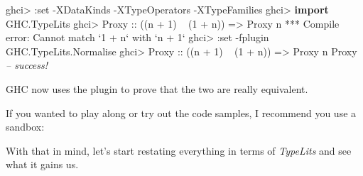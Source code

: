 \documentclass[]{article}
\newenvironment{Shaded}{}{}
\newcommand{\KeywordTok}[1]{\textcolor[rgb]{0.00,0.44,0.13}{\textbf{{#1}}}}
\newcommand{\DataTypeTok}[1]{\textcolor[rgb]{0.56,0.13,0.00}{{#1}}}
\newcommand{\DecValTok}[1]{\textcolor[rgb]{0.25,0.63,0.44}{{#1}}}
\newcommand{\CommentTok}[1]{\textcolor[rgb]{0.38,0.63,0.69}{\textit{{#1}}}}
\newcommand{\OtherTok}[1]{\textcolor[rgb]{0.00,0.44,0.13}{{#1}}}
\newcommand{\FunctionTok}[1]{\textcolor[rgb]{0.02,0.16,0.49}{{#1}}}
\newcommand{\NormalTok}[1]{{#1}}
\begin{document}
\begin{Shaded}
\begin{Highlighting}[]
\NormalTok{ghci}\FunctionTok{>} \FunctionTok{:}\NormalTok{set }\FunctionTok{-}\DataTypeTok{XDataKinds} \FunctionTok{-}\DataTypeTok{XTypeOperators} \FunctionTok{-}\DataTypeTok{XTypeFamilies}
\NormalTok{ghci}\FunctionTok{>} \KeywordTok{import }\DataTypeTok{GHC.TypeLits}
\NormalTok{ghci}\FunctionTok{>} \DataTypeTok{Proxy}\OtherTok{ ::} \NormalTok{((n }\FunctionTok{+} \DecValTok{1}\NormalTok{) }\FunctionTok{~} \NormalTok{(}\DecValTok{1} \FunctionTok{+} \NormalTok{n)) }\OtherTok{=>} \DataTypeTok{Proxy} \NormalTok{n}
\FunctionTok{***} \DataTypeTok{Compile} \NormalTok{error}\FunctionTok{:} \DataTypeTok{Cannot} \NormalTok{match }\OtherTok{`1 + n`} \NormalTok{with }\OtherTok{`n + 1`}
\NormalTok{ghci}\FunctionTok{>} \FunctionTok{:}\NormalTok{set }\FunctionTok{-}\NormalTok{fplugin }\DataTypeTok{GHC.TypeLits.Normalise}
\NormalTok{ghci}\FunctionTok{>} \DataTypeTok{Proxy}\OtherTok{ ::} \NormalTok{((n }\FunctionTok{+} \DecValTok{1}\NormalTok{) }\FunctionTok{~} \NormalTok{(}\DecValTok{1} \FunctionTok{+} \NormalTok{n)) }\OtherTok{=>} \DataTypeTok{Proxy} \NormalTok{n}
\DataTypeTok{Proxy}   \CommentTok{-- success!}
\end{Highlighting}
\end{Shaded}

GHC now uses the plugin to prove that the two are really equivalent.

If you wanted to play along or try out the code samples, I recommend you use a
sandbox:

\begin{Shaded}
\end{Shaded}

With that in mind, let's start restating everything in terms of \emph{TypeLits}
and see what it gains us.
\end{document}

